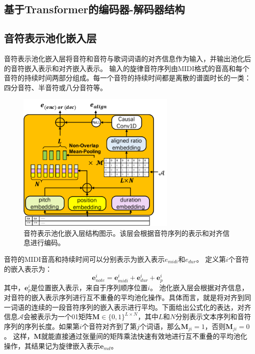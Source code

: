 \subsection{基于Transformer的编码器-解码器结构}
\label{sec:transformer_enc_dec}
\subsection{音符表示池化嵌入层}
\label{sec:note_pooling}
音符表示池化嵌入层将音符和音符与歌词词语的对齐信息作为输入，并输出池化后的音符嵌入表示和对齐嵌入表示。
输入的旋律音符序列由MIDI格式的音高和每个音符的持续时间两部分组成。每一个音符的持续时间都是离散的谱面时长的一类：四分音符、半音符或八分音符等。
\begin{figure}[t]
    \centering
    \label{fig:align_enc}
    \includegraphics[width=0.69\textwidth,clip=true]{figure/ast/note-pooling.pdf}
    \caption{音符表示池化嵌入层结构图示。该层会根据音符序列的表示和对齐信息进行编码。}
    \label{fig:align_enc}
\end{figure}
音符的MIDI音高和持续时间可以分别表示为嵌入表示$e_{midi}$和$e_{dur}$。
定义第$i$个音符的嵌入表示为：
\begin{equation}
\label{eq:note}
    \mathbf{e}_{note}^i=\mathbf{e}_{midi}^i+\mathbf{e}_{dur}^i+\mathbf{e}_p^i
\end{equation}
其中，$\mathbf{e}_p^i$是位置嵌入表示，来自于序列顺序位置$i$。
池化嵌入层会根据对齐信息，对音符的嵌入表示序列进行互不重叠的平均池化操作。具体而言，就是将对齐到同一词语的连续的一段音符序列的嵌入表示进行平均。下面给出公式化的表达，对齐信息$\mathcal{A}$会被表示为一个01矩阵$\mathbf{M} \in \{0,1\}^{L \times N}$，其中$L$和$N$分别表示文本序列和音符序列的序列长度。如果第$i$个音符对齐到了第$j$个词语，那么$\mathbf{M}_{ji}=1$，否则$\mathbf{M}_{ji}=0$。
这样，$\mathbf{M}$就能直接通过张量间的矩阵乘法快速有效地进行互不重叠的平均池化操作，其结果记为旋律嵌入表示$\mathbf{e}_{md}$。
